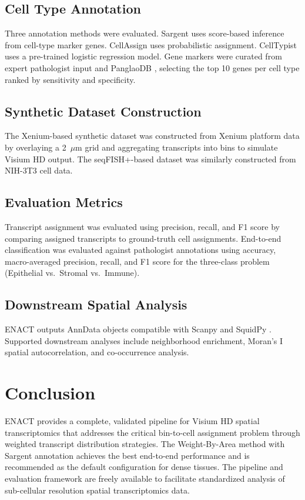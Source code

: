 \documentclass[11pt]{article}
\begin{document}
\subsection{Cell Type Annotation}

Three annotation methods were evaluated. Sargent \citep{sargent2023annotation} uses score-based inference from cell-type marker genes. CellAssign \citep{zhang2019cellassign} uses probabilistic assignment. CellTypist \citep{dominguez2022celltypist} uses a pre-trained logistic regression model. Gene markers were curated from expert pathologist input and PanglaoDB \citep{franzen2019panglaodb}, selecting the top 10 genes per cell type ranked by sensitivity and specificity.

\subsection{Synthetic Dataset Construction}

The Xenium-based synthetic dataset was constructed from Xenium platform data \citep{janesick2023xenium} by overlaying a 2~$\mu$m grid and aggregating transcripts into bins to simulate Visium HD output. The seqFISH+-based dataset \citep{eng2019seqfish} was similarly constructed from NIH-3T3 cell data.

\subsection{Evaluation Metrics}

Transcript assignment was evaluated using precision, recall, and F1 score by comparing assigned transcripts to ground-truth cell assignments. End-to-end classification was evaluated against pathologist annotations using accuracy, macro-averaged precision, recall, and F1 score for the three-class problem (Epithelial vs.\ Stromal vs.\ Immune).

\subsection{Downstream Spatial Analysis}

ENACT outputs AnnData objects \citep{virshup2023anndata} compatible with Scanpy \citep{wolf2018scanpy} and SquidPy \citep{palla2022squidpy}. Supported downstream analyses include neighborhood enrichment, Moran's I spatial autocorrelation, and co-occurrence analysis.

\section{Conclusion}

ENACT provides a complete, validated pipeline for Visium HD spatial transcriptomics that addresses the critical bin-to-cell assignment problem through weighted transcript distribution strategies. The Weight-By-Area method with Sargent annotation achieves the best end-to-end performance and is recommended as the default configuration for dense tissues. The pipeline and evaluation framework are freely available to facilitate standardized analysis of sub-cellular resolution spatial transcriptomics data.



\end{document}
